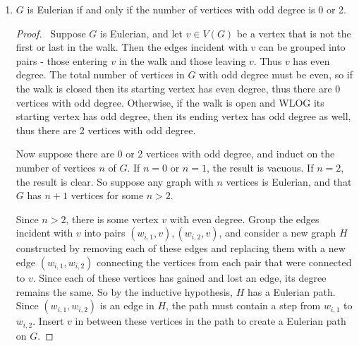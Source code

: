 \documentclass[12pt]{article}
\begin{document}
\begin{enumerate}[leftmargin=0cm,itemindent=.5cm,labelwidth=\itemindent,labelsep=0cm,align=left]
\begin{proof}
If the path from $y$ to $v$ retraverses the path from $v$ to $x$, then its length is $s+1$, thus the lengths of the shortest paths from $v$ to $x$ and from $v$ to $y$ have different parity.  So assume this is not the case.  Then the path from $y$ back to $v$ does not touch any vertex along the path from $v$ to $x$ (otherwise a shorter path would be made by retraversing that path completely).  Thus the complete path forms a subgraph isomorphic to $C_n$ (which is a path of length $n$), and by assumption $n$ must be even.  So the total length of the path $s + t + 1$ is even, so $s + t$ is odd.  Therefore, $s$ and $t$ have different parity in all cases.  So $x$ and $y$ come from different choices of $A_{H_i}$ and $B_{H_i}$.

Thus $A = \bigcup\limits_{i=1}^k A_{H_i}$ and $B = \bigcup\limits_{i=1}^k B_{H_i}$ form a partition of $G$ which satisfies the necessary conditions, so $G$ is biparte.
\end{proof}

\item $G$ is Eulerian if and only if the number of vertices with odd degree is 0 or 2.

\begin{proof}

\ Suppose $G$ is Eulerian, and let $v \in V(G)$ be a vertex that is not the first or last in the walk.  Then the edges incident with $v$ can be grouped into pairs - those entering $v$ in the walk and those leaving $v$.  Thus $v$ has even degree.  The total number of vertices in $G$ with odd degree must be even, so if the walk is closed then its starting vertex has even degree, thus there are 0 vertices with odd degree.  Otherwise, if the walk is open and WLOG its starting vertex has odd degree, then its ending vertex has odd degree as well, thus there are 2 vertices with odd degree.

Now suppose there are 0 or 2 vertices with odd degree, and induct on the number of vertices $n$ of $G$.  If $n=0$ or $n=1$, the result is vacuous.  If $n=2$, the result is clear.  So suppose any graph with $n$ vertices is Eulerian, and that $G$ has $n+1$ vertices for some $n > 2$.

Since $n > 2$, there is some vertex $v$ with even degree.  Group the edges incident with $v$ into pairs $(w_{i,1},v), (w_{i,2},v)$, and consider a new graph $H$ constructed by removing each of these edges and replacing them with a new edge $(w_{i,1}, w_{i,2})$ connecting the vertices from each pair that were connected to $v$.  Since each of these vertices has gained and lost an edge, its degree remains the same.  So by the inductive hypothesis, $H$ has a Eulerian path.  Since $(w_{i,1}, w_{i,2})$ is an edge in $H$, the path must contain a step from $w_{i,1}$ to $w_{i,2}$.  Insert $v$ in between these vertices in the path to create a Eulerian path on $G$.


\end{proof}
\end{enumerate}
\end{document}
